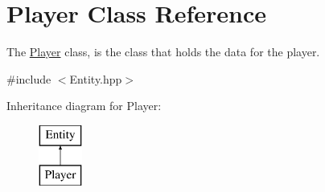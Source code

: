 \hypertarget{class_player}{\section{Player Class Reference}
\label{class_player}
}


The \hyperlink{class_player}{Player} class, is the class that holds the data for the player.  




{\ttfamily \#include $<$Entity.\-hpp$>$}

Inheritance diagram for Player\-:\begin{figure}[H]
\begin{center}
\leavevmode
\includegraphics[height=2.000000cm]{class_player}
\end{center}
\end{figure}
